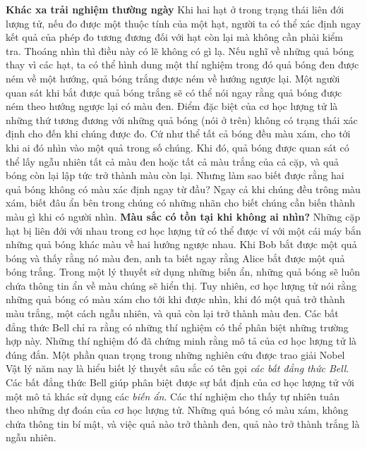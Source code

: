 \begin{multicols}{2}
	\vskip 0.1cm
	\textbf{\color{timhieukhoahoc}Khác xa trải nghiệm thường ngày}
	\vskip 0.1cm
	Khi hai hạt ở trong trạng thái liên đới lượng tử, nếu đo được một thuộc tính của một hạt, người ta có thể xác định ngay kết quả của phép đo tương đương đối với hạt còn lại mà không cần phải kiểm tra.
	\vskip 0.1cm
	Thoáng nhìn thì điều này có lẽ không có gì lạ. Nếu nghĩ về những quả bóng thay vì các hạt, ta có thể hình dung một thí nghiệm trong đó quả bóng đen được ném về một hướng, quả bóng trắng được ném về hướng ngược lại. Một người quan sát khi bắt được quả bóng trắng sẽ có thể nói ngay rằng quả bóng được ném theo hướng ngược lại có màu đen.
	\vskip 0.1cm
	Điểm đặc biệt của cơ học lượng tử là những thứ tương đương với những quả bóng (nói ở trên) không có trạng thái xác định cho đến khi chúng được đo. Cứ như thể tất cả bóng đều màu xám, cho tới khi ai đó nhìn vào một quả trong số chúng. Khi đó, quả bóng được quan sát có thể lấy ngẫu nhiên tất cả màu đen hoặc tất cả màu trắng của cả cặp, và quả bóng còn lại lập tức trở thành màu còn lại.
	\vskip 0.1cm
	Nhưng làm sao biết được rằng hai quả bóng không có màu xác định ngay từ đầu? Ngay cả khi chúng đều trông màu xám, biết đâu ẩn bên trong chúng có những nhãn cho biết chúng cần biến thành màu gì khi có người nhìn.
	\vskip 0.1cm
	\textbf{\color{timhieukhoahoc}Màu sắc có tồn tại khi không ai nhìn?}
	\vskip 0.1cm
	Những cặp hạt bị liên đới với nhau trong cơ học lượng tử có thể được ví với một cái máy bắn những quả bóng khác màu về hai hướng ngược nhau. Khi Bob bắt được một quả bóng và thấy rằng nó màu đen, anh ta biết ngay rằng Alice bắt được một quả bóng trắng. Trong một lý thuyết sử dụng những biến ẩn, những quả bóng sẽ luôn chứa thông tin ẩn về màu chúng sẽ hiển thị. Tuy nhiên, cơ học lượng tử nói rằng những quả bóng có màu xám cho tới khi được nhìn, khi đó một quả trở thành màu trắng, một cách ngẫu nhiên, và quả còn lại trở thành màu đen. Các bất đẳng thức Bell chỉ ra rằng có những thí nghiệm có thể phân biệt những trường hợp này. Những thí nghiệm đó đã chứng minh rằng mô tả của cơ học lượng tử là đúng đắn.
	\vskip 0.1cm
	Một phần quan trọng trong những nghiên cứu được trao giải Nobel Vật lý năm nay là hiểu biết lý thuyết sâu sắc có tên gọi \textit{các bất đẳng thức Bell}. Các bất đẳng thức Bell giúp phân biệt được sự bất định của cơ học lượng tử với một mô tả khác sử dụng các \textit{biến ẩn}. Các thí nghiệm cho thấy tự nhiên tuân theo những dự đoán của cơ học lượng tử. Những quả bóng có màu xám, không chứa thông tin bí mật, và việc quả nào trở thành đen, quả nào trở thành trắng là ngẫu nhiên.
	\begin{figure}[H]

\end{figure}
\end{multicols}
